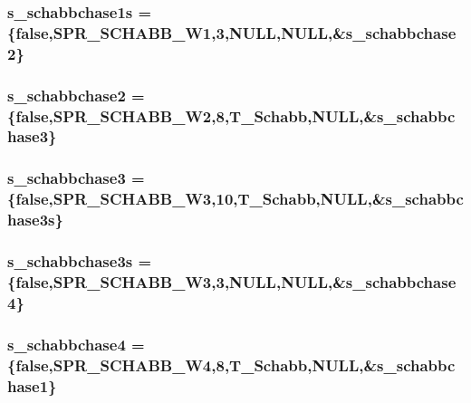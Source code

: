 \label{WL__ACT2_8C_aec6fd3f192ea893821d9f9707bcc714a}
\hypertarget{WL__ACT2_8C_ae61107bc3f8263290b22ccd4f2c38c66}{
\subsubsection[{s\_\-schabbchase1s}]{ {\bf s\_\-schabbchase1s} = \{false,SPR\_\-SCHABB\_\-W1,3,NULL,NULL,\&{\bf s\_\-schabbchase2}\}}}
\label{WL__ACT2_8C_ae61107bc3f8263290b22ccd4f2c38c66}
\hypertarget{WL__ACT2_8C_af553c4ef1907ec503c521deaaea8e80d}{
\subsubsection[{s\_\-schabbchase2}]{ {\bf s\_\-schabbchase2} = \{false,SPR\_\-SCHABB\_\-W2,8,T\_\-Schabb,NULL,\&{\bf s\_\-schabbchase3}\}}}
\label{WL__ACT2_8C_af553c4ef1907ec503c521deaaea8e80d}
\hypertarget{WL__ACT2_8C_ad4e74b25847638ebca63b49f2ae155b3}{
\subsubsection[{s\_\-schabbchase3}]{ {\bf s\_\-schabbchase3} = \{false,SPR\_\-SCHABB\_\-W3,10,T\_\-Schabb,NULL,\&{\bf s\_\-schabbchase3s}\}}}
\label{WL__ACT2_8C_ad4e74b25847638ebca63b49f2ae155b3}
\hypertarget{WL__ACT2_8C_aba7910cb33ab245b81e80bd07be2cc33}{
\subsubsection[{s\_\-schabbchase3s}]{ {\bf s\_\-schabbchase3s} = \{false,SPR\_\-SCHABB\_\-W3,3,NULL,NULL,\&{\bf s\_\-schabbchase4}\}}}
\label{WL__ACT2_8C_aba7910cb33ab245b81e80bd07be2cc33}
\hypertarget{WL__ACT2_8C_ab0fd2868bb492ae069b33cb3fd3dc445}{
\subsubsection[{s\_\-schabbchase4}]{ {\bf s\_\-schabbchase4} = \{false,SPR\_\-SCHABB\_\-W4,8,T\_\-Schabb,NULL,\&{\bf s\_\-schabbchase1}\}}}
